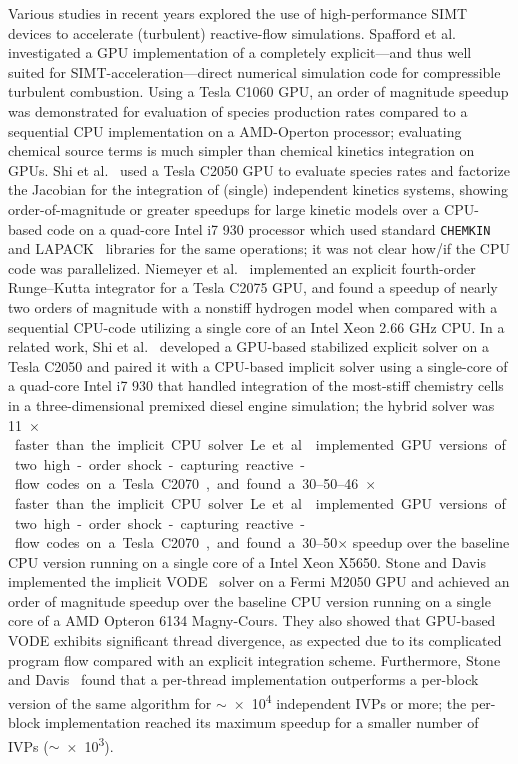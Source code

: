 \documentclass[preprint,review,11pt]{elsarticle}
\begin{document}
Various studies in recent years explored the use of high-performance SIMT devices to accelerate (turbulent) reactive-flow simulations.
Spafford et al.~\cite{Spafford:2010aa} investigated a GPU implementation of a completely explicit---and thus well suited for SIMT-acceleration---direct numerical simulation code for compressible turbulent combustion.
Using a Tesla C1060 GPU, an order of magnitude speedup was demonstrated for evaluation of species production rates compared to a sequential CPU implementation on a AMD-Operton processor; evaluating chemical source terms is much simpler than chemical kinetics integration on GPUs.
Shi et al.~\cite{Shi:2011aa} used a Tesla C2050 GPU to evaluate species rates and factorize the Jacobian for the integration of (single) independent kinetics systems, showing order-of-magnitude or greater speedups for large kinetic models over a CPU-based code on a quad-core Intel i7 930 processor which used standard \texttt{CHEMKIN}~\cite{kee1989chemkin} and LAPACK~\cite{Anderson:1999aa} libraries for the same operations; it was not clear how\slash if the CPU code was parallelized.
Niemeyer et al.~\cite{Niemeyer:2011aa} implemented an explicit fourth-order Runge--Kutta integrator for a Tesla C2075 GPU, and found a speedup of nearly two orders of magnitude with a nonstiff hydrogen model when compared with a sequential CPU-code utilizing a single core of an Intel Xeon 2.66 GHz CPU.
In a related work, Shi et al.~\cite{Shi:2012aa} developed a GPU-based stabilized explicit solver on a Tesla C2050 and paired it with a CPU-based implicit solver using a single-core of a quad-core Intel i7 930 that handled integration of the most-stiff chemistry cells in a three-dimensional premixed diesel engine simulation; the hybrid solver was \SIrange{11}{46}{$\times$} faster than the implicit CPU solver.
Le et al.~\cite{Le2013596} implemented GPU versions of two high-order shock-capturing reactive-flow codes on a Tesla C2070, and found a \numrange{30}{50}$\times$ speedup over the baseline CPU version running on a single core of a Intel Xeon X5650.
Stone and Davis~\cite{Stone:2013aa} implemented the implicit VODE~\cite{Brown:1989vl} solver on a Fermi M2050 GPU and achieved an order of magnitude speedup over the baseline CPU version running on a single core of a AMD Opteron 6134 Magny-Cours.
They also showed that GPU-based VODE exhibits significant thread divergence, as expected due to its complicated program flow compared with an explicit integration scheme.
Furthermore, Stone and Davis~\cite{Stone:2013aa} found that a per-thread implementation outperforms a per-block version of the same algorithm for $\sim$\num{e4} independent IVPs or more; the per-block implementation reached its maximum speedup for a smaller number of IVPs ($\sim$\num{e3}).
\end{document}
